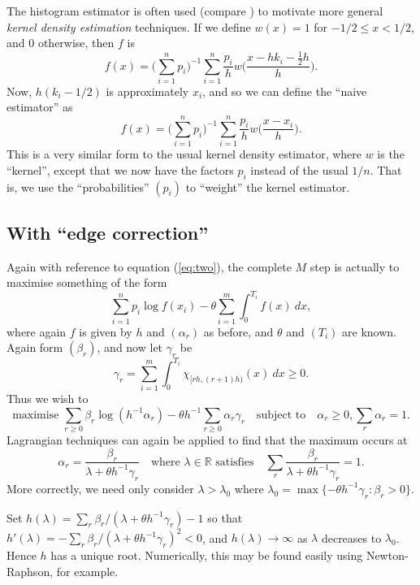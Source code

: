 \documentclass[twoside,a4paper]{article}
\theoremstyle{plain}
\theoremstyle{definition}
\begin{document}
The histogram estimator is often used (compare \cite[Section~2.4]{sil})
to motivate more general \emph{kernel density estimation} techniques.  
If we define $w(x) = 1$ for $-1/2 \leq x < 1/2$, and $0$ otherwise, then $f$ is
\[ f(x) = \Big(\sum_{i=1}^n p_i\Big)^{-1}
\sum_{i=1}^n \frac{p_i}{h} w\Big( \frac{x-hk_i - \frac12 h}{h} \Big). \]
Now, $h(k_i-1/2)$ is approximately $x_i$, and so we can define the ``naive estimator'' as
\begin{equation}
f(x) = \Big(\sum_{i=1}^n p_i\Big)^{-1}
\sum_{i=1}^n \frac{p_i}{h} w\Big( \frac{x-x_i}{h} \Big).
\label{eq:wkde}
\end{equation}
This is a very similar form to the usual kernel density estimator, where $w$ is the
``kernel'', except that we now have the factors $p_i$ instead of the usual $1/n$.
That is, we use the ``probabilities'' $(p_i)$ to ``weight'' the kernel estimator.



\subsection{With ``edge correction''}\label{app:his_est_edge}

Again with reference to equation (\ref{eq:two}), the complete $M$ step
is actually to maximise something of the form
\[ \sum_{i=1}^n p_i \log f(x_i) - \theta \sum_{i=1}^m \int_0^{T_i} f(x) \ dx, \]
where again $f$ is given by $h$ and $(\alpha_r)$ as before, and $\theta$ and
$(T_i)$ are known.  Again form $(\beta_r)$, and
now let $\gamma_r$ be
\[ \gamma_r = \sum_{i=1}^m \int_0^{T_i} \chi_{[rh,(r+1)h)}(x) \ dx \geq 0. \]
Thus we wish to
\[ \text{maximise } \sum_{r\geq 0} \beta_r \log(h^{-1}\alpha_r)
- \theta h^{-1}\sum_{r\geq 0} \alpha_r \gamma_r
\quad\text{subject to}\quad
\alpha_r \geq 0, \sum_r \alpha_r = 1. \]
Lagrangian techniques can again be applied to find that the maximum occurs at
\[ \alpha_r = \frac{\beta_r}{\lambda + \theta h^{-1}\gamma_r}
\quad\text{where $\lambda\in\mathbb R$ satisfies}\quad
\sum_r \frac{\beta_r}{\lambda + \theta h^{-1}\gamma_r} = 1. \]
More correctly, we need only consider $\lambda > \lambda_0$ where
$\lambda_0 = \max\{ -\theta h^{-1} \gamma_r : \beta_r>0 \}$.

Set $h(\lambda) = \sum_r \beta_r / (\lambda+\theta h^{-1}\gamma_r) - 1$ so that
$h'(\lambda) = - \sum_r \beta_r / (\lambda+\theta h^{-1}\gamma_r)^2 < 0$, and
$h(\lambda)\rightarrow\infty$ as $\lambda$ decreases to $\lambda_0$.
Hence $h$ has a unique root.  Numerically,
this may be found easily using Newton-Raphson, for example.
\end{document}
